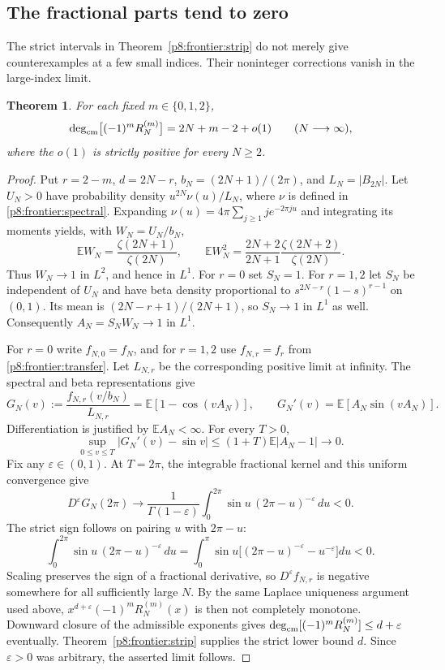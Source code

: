\documentclass[11pt,a4paper]{article}
\newtheorem{theorem}{Theorem}[section]
\theoremstyle{definition}
\theoremstyle{remark}
\numberwithin{equation}{section}
\begin{document}
\subsection{The fractional parts tend to zero}
\label{p8:subsec:degree-asymptotics}
The strict intervals in Theorem~\ref{p8:frontier:strip} do not merely give
counterexamples at a few small indices. Their noninteger corrections
vanish in the large-index limit.

\begin{theorem}\label{p8:thm:degree-asymptotics}
For each fixed $m\in\{0,1,2\}$,
\[
 \deg_{\rm cm}\bigl[(-1)^m R_N^{(m)}\bigr]
       =2N+m-2+o(1)\qquad(N\longrightarrow\infty),
\]
where the $o(1)$ is strictly positive for every $N\ge2$.
\end{theorem}
\begin{proof}
Put $r=2-m$, $d=2N-r$, $b_N=(2N+1)/(2\pi)$, and
$L_N=|B_{2N}|$. Let $U_N>0$ have probability density
$u^{2N}\nu(u)/L_N$, where $\nu$ is defined in
\eqref{p8:frontier:spectral}. Expanding $\nu(u)=4\pi\sum_{j\ge1}je^{-2\pi ju}$
and integrating its moments yields, with $W_N=U_N/b_N$,
\[
 \mathbb E W_N=\frac{\zeta(2N+1)}{\zeta(2N)},\qquad
 \mathbb E W_N^2=\frac{2N+2}{2N+1}
                    \frac{\zeta(2N+2)}{\zeta(2N)}.
\]
Thus $W_N\to1$ in $L^2$, and hence in $L^1$.
For $r=0$ set $S_N=1$. For $r=1,2$ let $S_N$ be independent of $U_N$
and have beta density proportional to
$s^{2N-r}(1-s)^{r-1}$ on $(0,1)$. Its mean is
$(2N-r+1)/(2N+1)$, so $S_N\to1$ in $L^1$ as well. Consequently
$A_N=S_NW_N\to1$ in $L^1$.

For $r=0$ write $f_{N,0}=f_N$, and for $r=1,2$ use $f_{N,r}=f_r$
from \eqref{p8:frontier:transfer}. Let $L_{N,r}$ be the corresponding
positive limit at infinity. The spectral and beta representations give
\[
 G_N(v):=\frac{f_{N,r}(v/b_N)}{L_{N,r}}
       =\mathbb E[1-\cos(v A_N)],\qquad
 G_N'(v)=\mathbb E[A_N\sin(v A_N)].
\]
Differentiation is justified by $\mathbb E A_N<\infty$. For every $T>0$,
\[
 \sup_{0\le v\le T}|G_N'(v)-\sin v|
 \le(1+T)\mathbb E|A_N-1|\longrightarrow0.
\]
Fix any $\varepsilon\in(0,1)$. At $T=2\pi$, the integrable fractional
kernel and this uniform convergence give
\[
 D^\varepsilon G_N(2\pi)\longrightarrow
 \frac1{\Gamma(1-\varepsilon)}
 \int_0^{2\pi}\sin u\,(2\pi-u)^{-\varepsilon}\,du<0.
\]
The strict sign follows on pairing $u$ with $2\pi-u$:
\[
 \int_0^{2\pi}\sin u\,(2\pi-u)^{-\varepsilon}\,du
 =\int_0^\pi\sin u\bigl[(2\pi-u)^{-\varepsilon}
                            -u^{-\varepsilon}\bigr]du<0.
\]
Scaling preserves the sign of a fractional derivative, so
$D^\varepsilon f_{N,r}$ is negative somewhere for all sufficiently
large $N$. By the same Laplace uniqueness argument used above,
$x^{d+\varepsilon}(-1)^mR_N^{(m)}(x)$ is then not completely monotone.
Downward closure of the admissible exponents gives
$\deg_{\rm cm}[(-1)^mR_N^{(m)}]\le d+\varepsilon$ eventually.
Theorem~\ref{p8:frontier:strip} supplies the strict lower bound $d$.
Since $\varepsilon>0$ was arbitrary, the asserted limit follows.
\end{proof}
\end{document}
